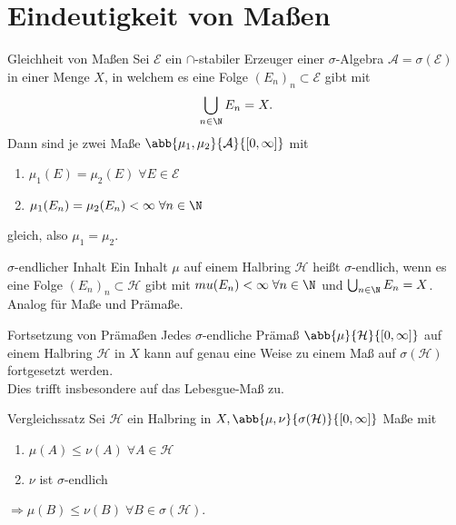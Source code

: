 \section*{Eindeutigkeit von Maßen}

\begin{karte}{Gleichheit von Maßen}
	Sei \( \mathcal{E} \) ein \(\cap\)-stabiler Erzeuger einer \( \sigma \)-Algebra \( \mathcal{A} = \sigma(\mathcal{E}) \) 
	in einer Menge \(X\), in welchem es eine Folge \( (E_n)_n \subset \mathcal{E} \) gibt mit 
	\[ \bigcup_{n\in\N} E_n = X. \] 
	Dann sind je zwei Maße \( \abb{\mu_1, \mu_2}{\mathcal{A}}{[0,\infty]} \) mit 
	\begin{enumerate}
		\item \( \mu_1(E) = \mu_2(E) \;\forall E\in \mathcal{E} \) 
		\item \( \mu_1(E_n) = \mu_2(E_n) < \infty \;\forall n\in \N \)
	\end{enumerate}
	gleich, also \(\mu_1 = \mu_2\).
\end{karte}
\begin{karte}{\(\sigma\)-endlicher Inhalt}
	Ein Inhalt \(\mu\) auf einem Halbring \( \mathcal{H} \) heißt 
	\( \sigma \)-endlich, wenn es eine Folge \( (E_n)_n \subset \mathcal{H} \) gibt mit 
	\( mu(E_n) < \infty \;\forall n\in\N\) und \( \bigcup_{n\in\N} E_n = X \).
	Analog für Maße und Prämaße.
\end{karte}
\begin{karte}{Fortsetzung von Prämaßen}
	Jedes \( \sigma \)-endliche Prämaß \(\abb{\mu}{\mathcal{H}}{[0,\infty]}\) auf einem Halbring 
	\( \mathcal{H} \) in \(X\) kann auf genau eine Weise zu einem Maß auf 
	\( \sigma(\mathcal{H}) \) fortgesetzt werden.\\
	Dies trifft insbesondere auf das Lebesgue-Maß zu.
\end{karte}
\begin{karte}{Vergleichssatz}
	Sei \( \mathcal{H} \) ein Halbring in \(X, \abb{\mu, \nu}{\sigma(\mathcal{H})}{[0,\infty]} \) Maße mit 
	\begin{enumerate}
		\item \( \mu(A) \leq \nu(A) \;\forall A\in \mathcal{H} \)
		\item \( \nu \) ist \(\sigma\)-endlich 
	\end{enumerate}
	\( \Rightarrow \mu(B) \leq \nu(B) \;\forall B\in \sigma(\mathcal{H})\).
\end{karte}
